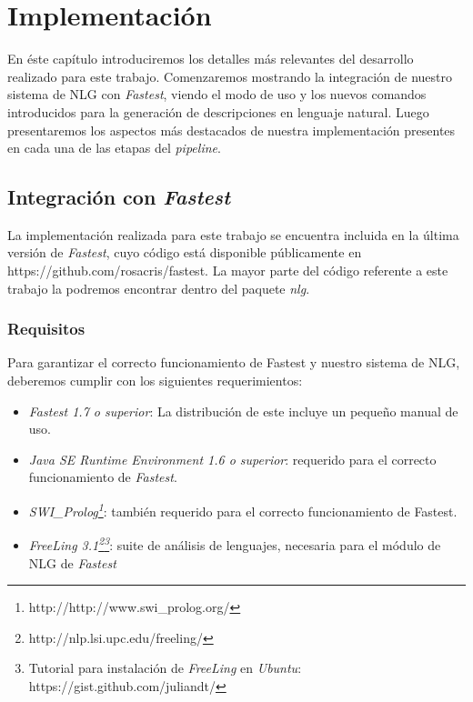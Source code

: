 \chapter{Implementación}
\label{cap:implementacion}

En éste capítulo introduciremos los detalles más relevantes del desarrollo realizado para este trabajo. Comenzaremos mostrando la integración de nuestro sistema de NLG con \textit{Fastest}, viendo el modo de uso y los nuevos comandos introducidos para la generación de descripciones en lenguaje natural. Luego presentaremos los aspectos más destacados de nuestra implementación presentes en cada una de las etapas del \emph{pipeline}.

\section{Integración con \emph{Fastest}}

La implementación realizada para este trabajo se encuentra incluida en la última versión de \emph{Fastest}, cuyo código está disponible públicamente en https://github.com/rosacris/fastest. La mayor parte del código referente a este trabajo la podremos encontrar dentro del paquete \textit{nlg}.

\subsection*{Requisitos}

Para garantizar el correcto funcionamiento de Fastest y nuestro sistema de NLG, deberemos cumplir con los siguientes requerimientos:

\begin{itemize}
 \item  \emph{Fastest 1.7 o superior}: La distribución de este incluye un pequeño manual de uso.
 \item  \emph{Java SE Runtime Environment 1.6 o superior}: requerido para el correcto funcionamiento de \emph{Fastest}.
 \item  \emph{SWI\_Prolog\footnote{http://http://www.swi\_prolog.org/}}: también requerido para el correcto funcionamiento de Fastest.
 \item  \emph{FreeLing 3.1\footnote{http://nlp.lsi.upc.edu/freeling/}\footnote{Tutorial para instalación de \emph{FreeLing} en \emph{Ubuntu}: https://gist.github.com/juliandt/}}: suite de análisis de lenguajes, necesaria para el módulo de NLG de \emph{Fastest}
\end{itemize}

